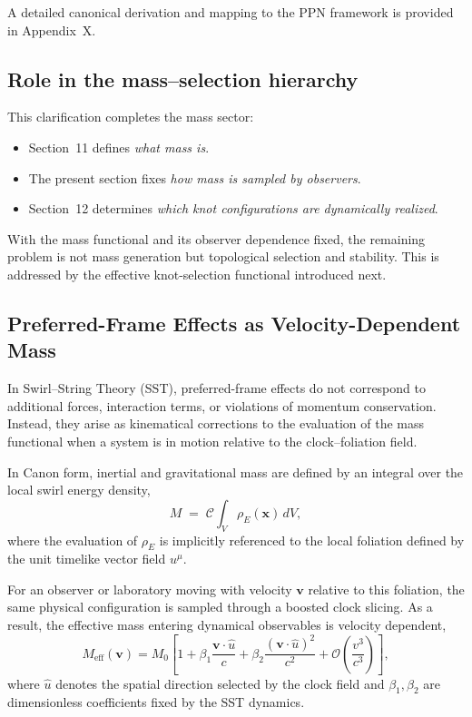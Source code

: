 \documentclass[10pt]{article}
\begin{document}
        A detailed canonical derivation and mapping to the PPN framework
        is provided in Appendix~X.

    \subsection{Role in the mass--selection hierarchy}

        This clarification completes the mass sector:
        \begin{itemize}
            \item Section~11 defines \emph{what mass is}.
            \item The present section fixes \emph{how mass is sampled by observers}.
            \item Section~12 determines \emph{which knot configurations are dynamically realized}.
        \end{itemize}

        With the mass functional and its observer dependence fixed,
        the remaining problem is not mass generation but topological
        selection and stability.
        This is addressed by the effective knot-selection functional
        introduced next.

    \subsection{Preferred-Frame Effects as Velocity-Dependent Mass}
    \label{sec:canon_preferred_frame_mass}

    In Swirl--String Theory (SST), preferred-frame effects do not correspond to
    additional forces, interaction terms, or violations of momentum conservation.
    Instead, they arise as kinematical corrections to the evaluation of the
    mass functional when a system is in motion relative to the clock--foliation
    field.

    In Canon form, inertial and gravitational mass are defined by an integral
    over the local swirl energy density,
    \begin{equation}
        M \;=\; \mathcal{C} \int_V \rho_{\!E}(\mathbf{x})\, dV ,
    \end{equation}
    where the evaluation of $\rho_{\!E}$ is implicitly referenced to the local
    foliation defined by the unit timelike vector field $u^\mu$.

    For an observer or laboratory moving with velocity $\mathbf{v}$ relative to
    this foliation, the same physical configuration is sampled through a boosted
    clock slicing. As a result, the effective mass entering dynamical observables
    is velocity dependent,
    \begin{equation}
        M_{\mathrm{eff}}(\mathbf{v})
        =
        M_0
        \left[
            1
            + \beta_1 \frac{\mathbf{v}\!\cdot\!\hat{u}}{c}
            + \beta_2 \frac{(\mathbf{v}\!\cdot\!\hat{u})^2}{c^2}
            + \mathcal{O}\!\left(\frac{v^3}{c^3}\right)
        \right],
    \end{equation}
    where $\hat{u}$ denotes the spatial direction selected by the clock field and
    $\beta_1,\beta_2$ are dimensionless coefficients fixed by the SST dynamics.
\end{document}

